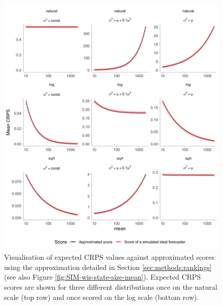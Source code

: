 \documentclass{article}
\begin{document}
\begin{figure}[h!]
\centering
\includegraphics[width = 1\textwidth]{output/figures/SIM-score-approximation.png}
\caption{
Visualisation of expected CRPS values against approximated scores using the approximation detailed in Section \ref{sec:methods:rankings} (see also Figure \ref{fig:SIM-wis-state-size-mean}). Expected CRPS scores are shown for three different distributions once on the natural scale (top row) and once scored on the log scale (bottom row).  
}
\label{fig:score-approx}
\end{figure}
\end{document}
